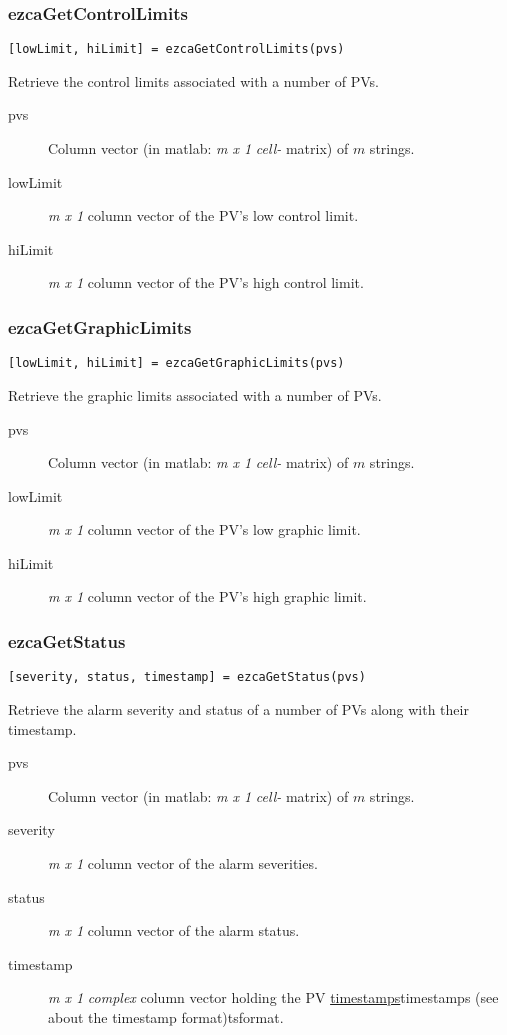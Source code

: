 \documentclass{article}
\newcommand{\ita}[1]{\emph{#1}}
\newcommand{\m}{$m$}
\newcommand{\mhack}{$m$} %
\newcommand{\mxl}{$m\times 1$}
\renewcommand{\m}{\ita{m}}
\newcommand{\mhack}{\ita{m}} %
\renewcommand{\mxl}{\ita{m x 1}}
\newcommand{\PVITEM}{
\item[pvs] Column vector (in matlab: \mxl{} \ita{cell-} matrix)
of \mhack{} strings.
}
\begin{document}
\subsubsection{ezcaGetControlLimits}
\begin{verbatim}
[lowLimit, hiLimit] = ezcaGetControlLimits(pvs)
\end{verbatim}
Retrieve the control limits associated with a number of PVs.
\begin{description}
\PVITEM
\item[lowLimit] \mxl{} column vector of the PV's low control limit.
\item[hiLimit]  \mxl{} column vector of the PV's high control limit.
\end{description}


\subsubsection{ezcaGetGraphicLimits}
\begin{verbatim}
[lowLimit, hiLimit] = ezcaGetGraphicLimits(pvs)
\end{verbatim}
Retrieve the graphic limits associated with a number of PVs.
\begin{description}
\PVITEM
\item[lowLimit] \mxl{} column vector of the PV's low graphic limit.
\item[hiLimit]  \mxl{} column vector of the PV's high graphic limit.
\end{description}


\subsubsection{ezcaGetStatus}
\begin{verbatim}
[severity, status, timestamp] = ezcaGetStatus(pvs)
\end{verbatim}
Retrieve the alarm severity and status of a number of PVs along
with their timestamp.
\begin{description}
\PVITEM
\item[severity] \mxl{} column vector of the alarm severities.
\item[status] \mxl{} column vector of the alarm status.
\item[timestamp] \mxl{} \ita{complex} column vector holding the
PV \hyperref[ref]{timestamps}{timestamps (see }{ about the timestamp format)}{tsformat}.
\end{description}
\end{document}
